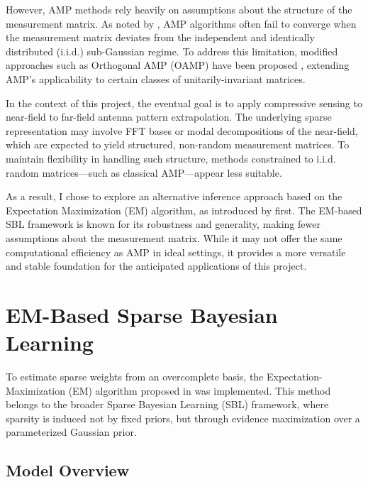\documentclass{article}
\begin{document}
However, AMP methods rely heavily on assumptions about the structure of the measurement matrix. As noted by \citet{zou2022concise}, AMP algorithms often fail to converge when the measurement matrix deviates from the independent and identically distributed (i.i.d.) sub-Gaussian regime. To address this limitation, modified approaches such as Orthogonal AMP (OAMP) have been proposed \citet{zou2022concise}, extending AMP's applicability to certain classes of unitarily-invariant matrices.

In the context of this project, the eventual goal is to apply compressive sensing to near-field to far-field antenna pattern extrapolation. The underlying sparse representation may involve FFT bases or modal decompositions of the near-field, which are expected to yield structured, non-random measurement matrices. To maintain flexibility in handling such structure, methods constrained to i.i.d. random matrices—such as classical AMP—appear less suitable.

As a result, I chose to explore an alternative inference approach based on the Expectation Maximization (EM) algorithm, as introduced by \citet{wipf2004sparse} first. The EM-based SBL framework is known for its robustness and generality, making fewer assumptions about the measurement matrix. While it may not offer the same computational efficiency as AMP in ideal settings, it provides a more versatile and stable foundation for the anticipated applications of this project.

\section{EM-Based Sparse Bayesian Learning}

To estimate sparse weights from an overcomplete basis, the Expectation-Maximization (EM) algorithm proposed in \citet{wipf2004sparse} was implemented. This method belongs to the broader Sparse Bayesian Learning (SBL) framework, where sparsity is induced not by fixed priors, but through evidence maximization over a parameterized Gaussian prior.

\subsection{Model Overview}
\end{document}
